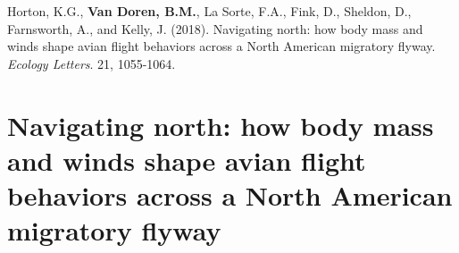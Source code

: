 \documentclass[a4paper, nobind]{templates/ociamthesis}
\begin{document}
 \begin{center}  \end{center} \newpage 
 \begin{center}  \end{center} \newpage 
 \begin{center}  \end{center} \newpage

\begin{savequote}
Horton, K.G., \textbf{Van Doren, B.M.}, La Sorte, F.A., Fink, D.,
Sheldon, D., Farnsworth, A., and Kelly, J. (2018). Navigating north: how
body mass and winds shape avian flight behaviors across a North American
migratory flyway. \emph{Ecology Letters}. 21, 1055-1064.
\end{savequote}

\hypertarget{app-plains}{
\chapter[Avian flight behaviors across a North American flyway]{Navigating north: how body mass and winds shape avian flight behaviors across a North American migratory flyway}\label{app-plains}}

\newpage
\end{document}
